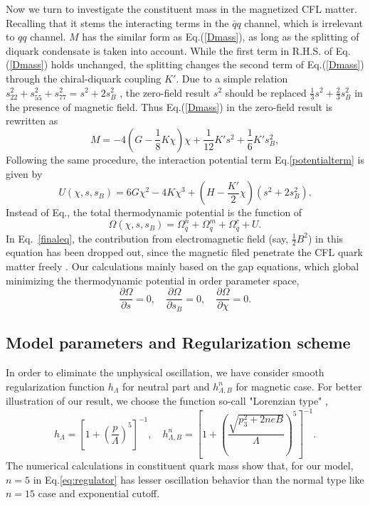 \documentclass[prd, showpacs,nofootinbib,amsmath,amssymb,12pt]{revtex4}
\begin{document}
Now we turn to investigate the constituent  mass in the magnetized CFL matter.
Recalling that it stems the interacting terms in the $\bar{q}q$ channel, which is irrelevant to
$qq$ channel. $M$ has the similar form as Eq.(\ref{Dmass}), as long as the  splitting of
diquark condensate is taken into account.
While the first term in R.H.S. of  Eq.(\ref{Dmass}) 
holds unchanged, the splitting  changes the second term of Eq.(\ref{Dmass})
through the chiral-diquark coupling $K'$.
Due to  a simple relation $s^2_{22}+s^2_{55}+s^2_{77} = s^2 + 2s_B^2$ , 
the zero-field result $s^2$ should be replaced  $\frac{1}{3}s^2+\frac{2}{3}s^2_{B}$
in the presence of magnetic field.
Thus Eq.(\ref{Dmass}) in the zero-field result is rewritten as
\begin{equation}
M=-4(G-\frac{1}{8}K\chi)\chi+\frac{1}{12}K's^2+\frac{1}{6}K's^2_B,
\end{equation}
Following the same procedure, the interaction potential term Eq.\ref{potentialterm} is given by
\begin{equation}
U(\chi,s,s_B)=6G\chi^2-4K\chi^3+(H-\frac{K'}{2}\chi)(s^2+2s^2_B).
\end{equation}
Instead of Eq., the  total thermodynamic potential is the function of 
\begin{equation}
\label{finaleq}
\Omega(\chi,s,s_B)=\Omega^n_q+\Omega^m_q+\Omega^c_q+U.
\end{equation}
In Eq.~\eqref{finaleq}, the contribution from electromagnetic field (say, $\frac{1}{2}B^2$) in this equation has been dropped out, since the magnetic filed penetrate the CFL quark matter freely \cite{ferrer2005magnetic,  Ferrer2006Color,  ferrer2007magnetic}. 
Our calculations mainly based on the gap equations, which global minimizing the thermodynamic potential in order parameter space,
\begin{equation}
\frac{\partial\Omega}{\partial s} =0,\quad 
\frac{\partial\Omega}{\partial s_B} =0,\quad 
\frac{\partial\Omega}{\partial \chi} =0.
\end{equation}

\subsection{Model parameters and Regularization scheme}
\label{sec:2c}
In order to eliminate the unphysical oscillation, 
we have consider smooth regularization function $h_{\Lambda}$ for neutral part and $h^n_{\Lambda, B}$ for magnetic case.
For better illustration of our result, 
we choose the function so-call "Lorenzian type" \cite{Frasca2011Magnetic},
\begin{equation}\label{eq:regulator}
  h_{\Lambda} = [1+(\frac{p}{\Lambda})^5]^{-1}, \quad  h^n_{\Lambda,B}=[1+(\frac{\sqrt{p_3^2 + 2neB}}{\Lambda})^5]^{-1}.
\end{equation}
The numerical calculations in constituent quark mass show that, for our model, $n=5$ in Eq.\eqref{eq:regulator} 
has lesser oscillation behavior than the normal type like $n=15$ case and exponential cutoff.
\end{document}
